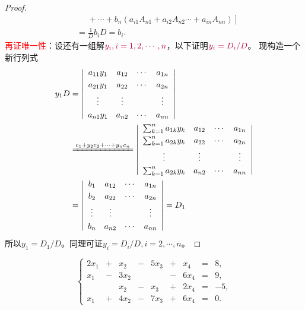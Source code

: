 \documentclass[10pt,a4paper%
tablecaptionabove]{article}
\newcommand{\red}{\textcolor{red}}
\newcommand{\purple}{\textcolor{purple}}
\newcommand{\cd}{\cdots}
\newcommand{\vd}{\vdots}
\begin{document}
\begin{CJK}{UTF8}{gkai}
\begin{proof}
$$\begin{array}{cl}
      &  \left. \ \ \ \ \ \ + \cd+ b_n(a_{i1} A_{n1}+ a_{i2} A_{n2}  \cd + a_{in}A_{nn}) \right] \\[0.3cm]
      & =   \frac 1D b_{i} D = b_i.
    \end{array}
    $$
    \red{再证唯一性}：设还有一组解$\purple{y_i, i = 1, 2, \cd, n}$，以下证明$\purple{y_i =D_i/D}$。
     现构造一个新行列式
    $$
    \begin{aligned}
      y_1D & =  \left|
        \begin{array}{cccc}
          a_{11}y_1 & a_{12}    &  \cd   &   a_{1n}      \\[0.1cm] 
          a_{21}y_1 & a_{22}    &  \cd   &   a_{2n}      \\[0.1cm] 
          \vd    &    \vd     &        &     \vd      \\[0.1cm] 
          a_{n1}y_1 & a_{n2}    &  \cd   &   a_{nn}      
        \end{array}
      \right| \\
      & \xlongequal{c_1 + y_2 c_2 + \cd + y_n c_n} 
      \left|
        \begin{array}{cccc}
          \sum_{k=1}^n a_{1k}y_k & a_{12}    &  \cd   &   a_{1n}      \\[0.1cm] 
          \sum_{k=1}^n a_{2k}y_k & a_{22}    &  \cd   &   a_{2n}      \\[0.1cm] 
          \vd    &    \vd     &        &     \vd      \\[0.1cm] 
          \sum_{k=1}^n a_{2k}y_k & a_{n2}    &  \cd   &   a_{nn}      
        \end{array}
      \right|  \\
      & = \left|
        \begin{array}{cccc}
          b_1 & a_{12}    &  \cd   &   a_{1n}      \\[0.1cm] 
          b_2 & a_{22}    &  \cd   &   a_{2n}      \\[0.1cm] 
          \vd    &    \vd     &        &     \vd      \\[0.1cm] 
          b_n & a_{n2}    &  \cd   &   a_{nn}      
        \end{array}
      \right|  = D_1
      \end{aligned}
      $$
      所以$y_1 = D_1/D$。同理可证$y_i=D_i/D, i = 2, \cd, n$。
    \end{proof}

    \begin{li}
        $$\left\{
        \begin{array}{rcrcrcrcr}
          2x_1 &+ & x_2 &- & 5x_3&+ & x_4 &= & 8, \\[0.2cm]
          x_1 &- & 3x_2&  &     &- & 6x_4& = & 9, \\[0.2cm]
          &  & x_2 &- & x_3 &+ & 2x_4 &= & -5, \\[0.2cm]
          x_1 &+ & 4x_2&-& 7x_3 &+& 6x_4 &= & 0.
        \end{array}
        \right.
        $$
      \end{li}


\end{CJK}
\end{document}
